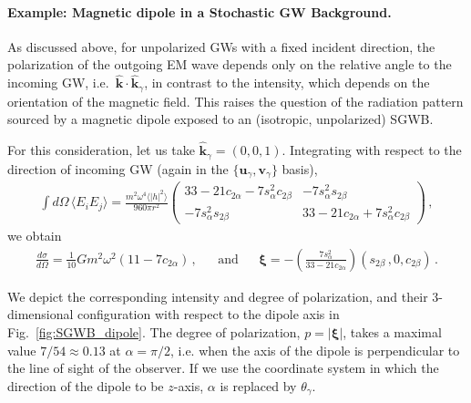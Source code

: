 \documentclass[a4paper,11pt]{article}
\begin{document}
\paragraph{Example: Magnetic dipole in a Stochastic GW Background.}
%
As discussed above, for unpolarized GWs with a fixed incident direction, the polarization of the outgoing EM wave depends only on the relative angle to the incoming GW, i.e.\ $\hat{\bm k} \cdot \hat{\bm{k}}_\gamma$, in contrast to the intensity, which  depends on the orientation of the magnetic field. This raises the question of the radiation pattern sourced by a magnetic dipole exposed to an (isotropic, unpolarized) SGWB.



For this consideration, let us take $ \hat{\bm k}_{\gamma} = (0,0,1) $. 
%
Integrating with respect to the direction of incoming GW (again in the $\{{\bm u}_\gamma, {\bm v}_\gamma\}$ basis),
%
\begin{equation}
    \begin{aligned}
     \int d\Omega \,   \langle {E_i E_j} \rangle  = \frac{m^{2} \omega^{4} \langle \vert h \vert^{2} \rangle }{960 \pi r^{2}} \begin{pmatrix}
        33 - 21 c_{2 \alpha} - 7 s^{2}_{\alpha}  c_{2 \beta} & - 7 s_{\alpha}^{2} s_{2\beta} \\
         - 7 s_{\alpha}^{2} s_{2\beta} & 33 - 21 c_{2 \alpha} + 7 s^{2}_{\alpha} c_{2 \beta} 
    \end{pmatrix}  \,, 
\end{aligned}
\end{equation}
we obtain 
%
\begin{align}
    \frac{d\sigma}{d\Omega}  = \frac{1}{10} Gm^{2} \omega^{2} \left( 11 - 7 c_{2 \alpha} \right) %
    \,,
&&
\text{and}
&&
    \bm{\xi} =  -  \left( \frac{ 7 s^{2}_\alpha }{33 - 21 c_{2 \alpha}} \right)  \left( s_{2 \beta} \,,0, c_{2 \beta} \right) %
    \,.
\end{align}
%

We depict the corresponding intensity and degree of polarization, and their 3-dimensional configuration with respect to the dipole axis in Fig.~\ref{fig:SGWB_dipole}.
The degree of polarization, $ p = \vert \bm{\xi} \vert$, takes a maximal value $ 7/54 \approx 0.13$ at $ \alpha = \pi / 2$, i.e. when the axis of the dipole is perpendicular to the line of sight of the observer. 
%
If we use the coordinate system in which the direction of the dipole to be $z$-axis, $ \alpha $ is replaced by $ \theta_{\gamma} $. 
%
\end{document}
